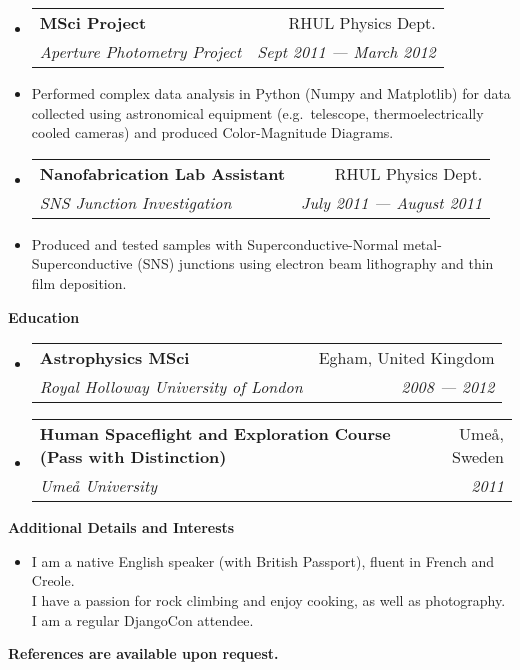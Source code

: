 \documentclass[letterpaper,11pt]{article}
\makeatletter
\newcommand{\resheading}[1]{{\large \colorbox{mygrey}
			{\begin{minipage}{\textwidth}
					{\textbf{#1 \vphantom{p\^{E}}}}
		\end{minipage}}}
	}
\newcommand{\ressubheading}[4]{
		\begin{tabular*}{180mm}{l@{\extracolsep{\fill}}r}
			\textbf{#1} & #2 \\
			\textit{#3} & \textit{#4} \\
		\end{tabular*}\vspace{-6pt}
	}
\newcommand{\resdescription}[1]{#1 \vspace{-0mm}}
\makeatother
\begin{document}
\begin{itemize}
		\item[]
			\ressubheading{MSci Project}{RHUL Physics Dept.}{Aperture Photometry Project}{Sept 2011 --- March 2012}
		\item[]
            \resdescription{Performed complex data analysis in Python (Numpy and Matplotlib) for data collected using astronomical equipment (e.g.\ telescope, thermoelectrically cooled cameras) and produced Color-Magnitude Diagrams.}

		\item[]
			\ressubheading{Nanofabrication Lab Assistant}{RHUL Physics Dept.}{SNS Junction Investigation}{July 2011 --- August 2011}
		\item[]
			\resdescription{Produced and tested samples with Superconductive-Normal metal-Superconductive (SNS) junctions using electron beam lithography and thin film deposition.}

	\end{itemize}

	\resheading{Education}
	\begin{itemize}
		\item[]
			\ressubheading{Astrophysics MSci }{Egham, United Kingdom}{Royal Holloway University of London}{2008 --- 2012}

		\item[]
			\ressubheading{Human Spaceflight and Exploration Course (Pass with Distinction)}{Ume\r{a}, Sweden}{Ume\r{a} University}{2011}

	\end{itemize}

	\resheading{Additional Details and Interests}
	\begin{itemize}
		\item[] I am a native English speaker (with British Passport), fluent in French and Creole.\\
			I have a passion for rock climbing and enjoy cooking, as well as photography. \\
			I am a regular DjangoCon attendee.\\
	\end{itemize}

	\textbf{References are available upon request.}

	
\end{document}
